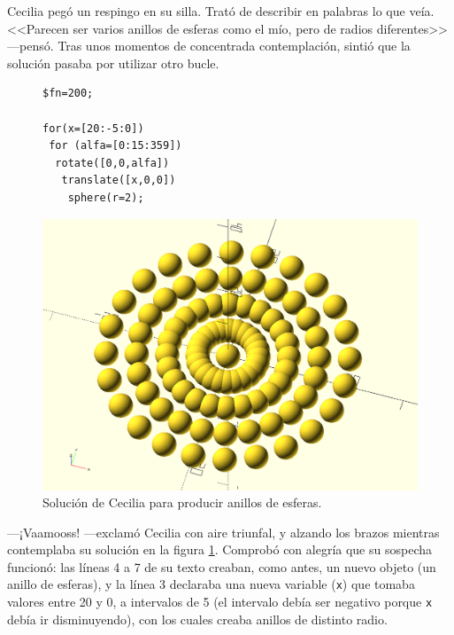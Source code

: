   Cecilia pegó un respingo en su silla. Trató de describir en palabras
  lo que veía. <<Parecen ser varios anillos de esferas como el mío,
  pero de radios diferentes>> ---pensó. Tras unos momentos de
  concentrada contemplación, sintió que la solución pasaba por
  utilizar otro bucle.

  \begin{figure}[b]
  \begin{minipage}[]{.5\textwidth}
    \begin{lstlisting}
$fn=200;

for(x=[20:-5:0])
 for (alfa=[0:15:359])
  rotate([0,0,alfa])
   translate([x,0,0])
    sphere(r=2);
    \end{lstlisting}%
  \end{minipage}\hfill
    \begin{minipage}[]{.5\textwidth}
      \centering
      \includegraphics[width=\textwidth]{imagenes/anillos-de-esferas}
    \end{minipage}
    \caption{Solución de Cecilia para producir anillos de esferas.}
    \label{fig:anillos-de-esferas-cecilia}
  \end{figure}


  ---¡Vaamooss! ---exclamó Cecilia con aire triunfal, y alzando los
  brazos mientras contemplaba su solución en la figura
  \ref{fig:anillos-de-esferas-cecilia}. Comprobó con alegría que su
  sospecha funcionó: las líneas 4 a 7 de su texto creaban, como antes,
  un nuevo objeto (un anillo de esferas), y la línea 3 declaraba una
  nueva variable (\texttt{x}) que tomaba valores entre 20 y 0, a
  intervalos de 5 (el intervalo debía ser negativo porque \texttt{x}
  debía ir disminuyendo), con los cuales creaba anillos de distinto
  radio.


